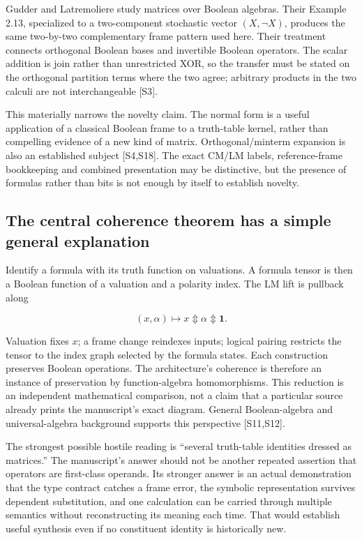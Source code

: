 \documentclass[
  10pt,
]{article}
\begin{document}
Gudder and Latremoliere study matrices over Boolean algebras. Their
Example 2.13, specialized to a two-component stochastic vector
\((X,\neg X)\), produces the same two-by-two complementary frame pattern
used here. Their treatment connects orthogonal Boolean bases and
invertible Boolean operators. The scalar addition is join rather than
unrestricted XOR, so the transfer must be stated on the orthogonal
partition terms where the two agree; arbitrary products in the two
calculi are not interchangeable {[}S3{]}.

This materially narrows the novelty claim. The normal form is a useful
application of a classical Boolean frame to a truth-table kernel, rather
than compelling evidence of a new kind of matrix. Orthogonal/minterm
expansion is also an established subject {[}S4,S18{]}. The exact CM/LM
labels, reference-frame bookkeeping and combined presentation may be
distinctive, but the presence of formulas rather than bits is not enough
by itself to establish novelty.

\subsection{The central coherence theorem has a simple general
explanation}\label{the-central-coherence-theorem-has-a-simple-general-explanation}

Identify a formula with its truth function on valuations. A formula
tensor is then a Boolean function of a valuation and a polarity index.
The LM lift is pullback along

\[
(x,\alpha)\longmapsto x\Updownarrow\alpha\Updownarrow\mathbf1.
\]

Valuation fixes \(x\); a frame change reindexes inputs; logical pairing
restricts the tensor to the index graph selected by the formula states.
Each construction preserves Boolean operations. The architecture's
coherence is therefore an instance of preservation by function-algebra
homomorphisms. This reduction is an independent mathematical comparison,
not a claim that a particular source already prints the manuscript's
exact diagram. General Boolean-algebra and universal-algebra background
supports this perspective {[}S11,S12{]}.

The strongest possible hostile reading is ``several truth-table
identities dressed as matrices.'' The manuscript's answer should not be
another repeated assertion that operators are first-class operands. Its
stronger answer is an actual demonstration that the type contract
catches a frame error, the symbolic representation survives dependent
substitution, and one calculation can be carried through multiple
semantics without reconstructing its meaning each time. That would
establish useful synthesis even if no constituent identity is
historically new.
\end{document}
